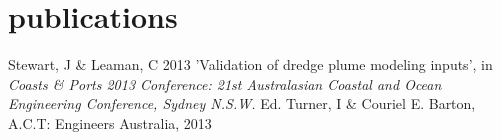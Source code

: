 \section{publications}
\begin{adjustwidth}{2cm}{}
Stewart, J \& Leaman, C 2013 'Validation of dredge plume modeling inputs', in {\emph{Coasts \& Ports 2013 Conference: 21st Australasian Coastal and Ocean Engineering Conference, Sydney N.S.W.}} Ed. Turner, I \& Couriel E. Barton, A.C.T: Engineers Australia, 2013
\end{adjustwidth}